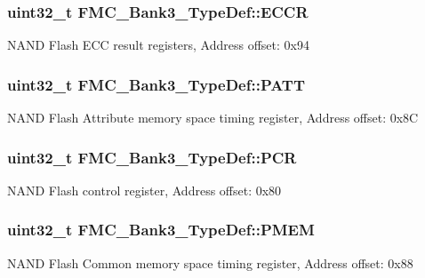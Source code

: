 \subsubsection[{\texorpdfstring{E\+C\+CR}{ECCR}}]{ uint32\+\_\+t F\+M\+C\+\_\+\+Bank3\+\_\+\+Type\+Def\+::\+E\+C\+CR}\hypertarget{struct_f_m_c___bank3___type_def_ab6c1398fb7158f021ab78a4231c67054}{}\label{struct_f_m_c___bank3___type_def_ab6c1398fb7158f021ab78a4231c67054}
N\+A\+ND Flash E\+CC result registers, Address offset\+: 0x94 
\subsubsection[{\texorpdfstring{P\+A\+TT}{PATT}}]{ uint32\+\_\+t F\+M\+C\+\_\+\+Bank3\+\_\+\+Type\+Def\+::\+P\+A\+TT}\hypertarget{struct_f_m_c___bank3___type_def_a4cca3d0ef62651cc93d4070278bb5376}{}\label{struct_f_m_c___bank3___type_def_a4cca3d0ef62651cc93d4070278bb5376}
N\+A\+ND Flash Attribute memory space timing register, Address offset\+: 0x8C 
\subsubsection[{\texorpdfstring{P\+CR}{PCR}}]{ uint32\+\_\+t F\+M\+C\+\_\+\+Bank3\+\_\+\+Type\+Def\+::\+P\+CR}\hypertarget{struct_f_m_c___bank3___type_def_ad7e74bf59532cbe667231e321bdf0de2}{}\label{struct_f_m_c___bank3___type_def_ad7e74bf59532cbe667231e321bdf0de2}
N\+A\+ND Flash control register, Address offset\+: 0x80 
\subsubsection[{\texorpdfstring{P\+M\+EM}{PMEM}}]{ uint32\+\_\+t F\+M\+C\+\_\+\+Bank3\+\_\+\+Type\+Def\+::\+P\+M\+EM}\hypertarget{struct_f_m_c___bank3___type_def_af34d82c290385286c11648a983ab3e71}{}\label{struct_f_m_c___bank3___type_def_af34d82c290385286c11648a983ab3e71}
N\+A\+ND Flash Common memory space timing register, Address offset\+: 0x88 
